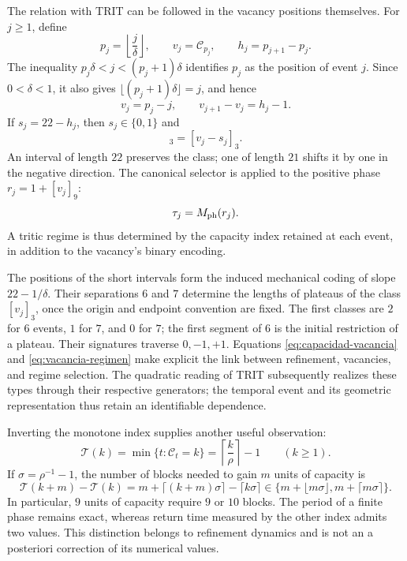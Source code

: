 The relation with TRIT can be followed in the vacancy positions themselves.
For \(j\geq1\), define
\[
 p_j=\left\lfloor\frac j\delta\right\rfloor,\qquad
 v_j=\mathcal C_{p_j},\qquad h_j=p_{j+1}-p_j.
\]
The inequality \(p_j\delta<j<(p_j+1)\delta\) identifies \(p_j\)
as the position of event \(j\). Since \(0<\delta<1\), it also
gives \(\lfloor(p_j+1)\delta\rfloor=j\), and hence
\[
 v_j=p_j-j,\qquad
 v_{j+1}-v_j=h_j-1.
\]
If \(s_j=22-h_j\), then \(s_j\in\{0,1\}\) and
\begin{equation}
 [v_{j+1}]_3=[v_j-s_j]_3.
 \label{eq:vacancia-regimen}
\end{equation}
An interval of length \(22\) preserves the class; one of length
\(21\) shifts it by one in the negative direction. The canonical
selector is applied to the positive phase \(r_j=1+[v_j]_9\):
\[
 \tau_j=M_{\rm ph}(r_j).
\]
A tritic regime is thus determined by the capacity index retained
at each event, in addition to the vacancy's binary encoding.

The positions of the short intervals form the induced mechanical
coding of slope \(22-1/\delta\). Their separations \(6\) and \(7\)
determine the lengths of plateaus of the class \([v_j]_3\), once
the origin and endpoint convention are fixed. The first classes are
\(2\) for \(6\) events, \(1\) for \(7\), and \(0\) for \(7\);
the first segment of \(6\) is the initial restriction of a plateau.
Their signatures traverse \(0,-1,+1\). Equations
\eqref{eq:capacidad-vacancia} and \eqref{eq:vacancia-regimen}
make explicit the link between refinement, vacancies, and regime
selection. The quadratic reading of TRIT subsequently realizes these
types through their respective generators; the temporal event and
its geometric representation thus retain an identifiable dependence.

Inverting the monotone index supplies another useful observation:
\[
 \mathcal T(k)=\min\{t:\mathcal C_t=k\}
   =\left\lceil\frac k\rho\right\rceil-1\qquad(k\geq1).
\]
If \(\sigma=\rho^{-1}-1\), the number of blocks needed to gain
\(m\) units of capacity is
\[
 \mathcal T(k+m)-\mathcal T(k)
 =m+\lceil(k+m)\sigma\rceil-\lceil k\sigma\rceil
 \in\{m+\lfloor m\sigma\rfloor,m+\lceil m\sigma\rceil\}.
\]
In particular, \(9\) units of capacity require \(9\) or \(10\)
blocks. The period of a finite phase remains exact, whereas return
time measured by the other index admits two values. This distinction
belongs to refinement dynamics and is not an a posteriori correction
of its numerical values.

